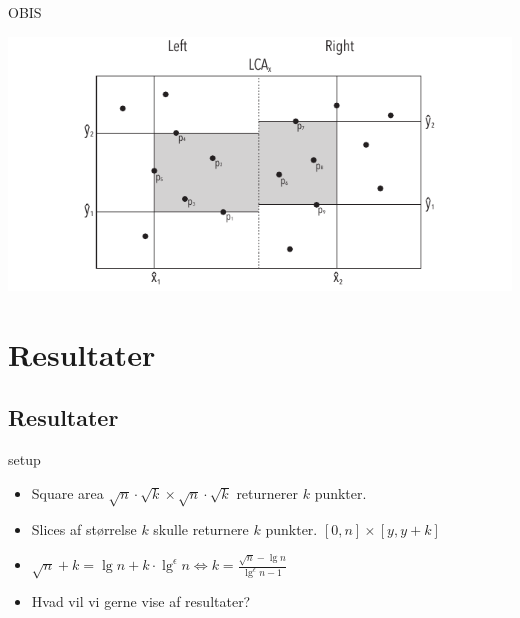 \documentclass[pdf]{beamer}
\begin{document}
\begin{frame}{OBIS}

  \includegraphics{pictures/ors_step3-eps-converted-to.pdf}
\end{frame}



\section{Resultater}
\subsection{Resultater}

\begin{frame}{setup}
  \begin{itemize}
    \item Square area $\sqrt{n}\cdot\sqrt{k}\times\sqrt{n}\cdot\sqrt{k}$ returnerer $k$ punkter.
    \item Slices af størrelse $k$ skulle returnere $k$ punkter. $[0,n] \times [y, y+k]$
    \item $\sqrt{n}+k = \lg n + k\cdot\lg^\epsilon n \Leftrightarrow k = \frac{\sqrt{n}-\lg n}{\lg^\epsilon n -1}$
  \end{itemize}
\end{frame}

\begin{frame}
  \begin{itemize}
    \item Hvad vil vi gerne vise af resultater?
  \end{itemize}
\end{frame}
\end{document}
